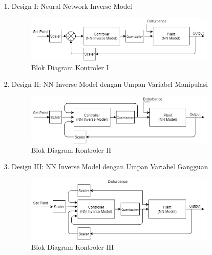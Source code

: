 \begin{enumerate}
	\item Design I: Neural Network Inverse Model
	\begin{figure}[!h]
		\centering
		\includegraphics[width=0.9\textwidth]{figures/ControlDesignDiagramI}
		\caption{Blok Diagram Kontroler I}
		\label{fig:4:ConstrolSystemBlockDiagramI}
	\end{figure}
	\vspace{1em}
	
	\item Design II: NN Inverse Model dengan Umpan Variabel Manipulasi\cite{paper42Paisan}
	\begin{figure}[!h]
		\centering
		\includegraphics[width=0.9\textwidth]{figures/ControlDesignDiagramII}
		\caption{Blok Diagram Kontroler II}
		\label{fig:4:ConstrolSystemBlockDiagramII}
	\end{figure}
	\vspace{3em}
	
	\item Design III: NN Inverse Model dengan Umpan Variabel Gangguan\cite{paper42LMa}
	\begin{figure}[!h]
		\centering
		\includegraphics[width=0.9\textwidth]{figures/ControlDesignDiagramIII}
		\caption{Blok Diagram Kontroler III}
		\label{fig:4:ConstrolSystemBlockDiagramIII}
	\end{figure}
	\vspace{1em}
	

\end{enumerate}

